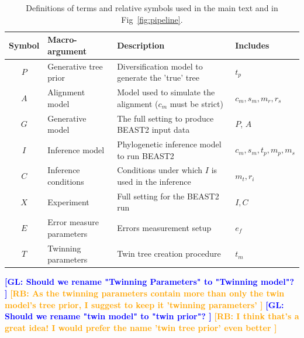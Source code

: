 \documentclass{article}
\newcommand{\giovanni}[1]{\textcolor{blue}{\textbf{[GL: #1]}}}
\newcommand{\richel}[1]{\textcolor{orange}{\textbf{[RB: #1]}}}
\begin{document}
\begin{table}
  \begin{tabular}{|@{}c|p{4cm}|p{9cm}|p{3cm}@{}|}
    \hline
    \centering
    \textbf{Symbol} & \textbf{Macro-argument} & \textbf{Description} 
      & \textbf{Includes} \\
    \hline
    $\mathit{P}$ & Generative tree prior & Diversification model to generate 
      the 'true' tree & $\mathit{t_{p}}$ \\
    $\mathit{A}$ & Alignment model & Model used to simulate the 
      alignment ($\mathit{c_{m}}$ must be strict) 
      & $\mathit{c_{m}}, \mathit{s_{m}}, \mathit{m_{r}}, \mathit{r_{s}}$ \\
    $\mathit{G}$ & Generative model & The full setting to produce BEAST2 input 
      data & $\mathit{P}$, $\mathit{A}$ \\
    $\mathit{I}$ & Inference model & Phylogenetic inference model to run BEAST2 
      & $\mathit{c_{m}}, \mathit{s_{m}}, \mathit{t_{p}}, 
      \mathit{m_{p}}, \mathit{m_{s}}$ \\
    $\mathit{C}$ & Inference conditions & Conditions under which $\mathit{I}$ 
      is used in the inference & $\mathit{m_{t}}, \mathit{r_{i}}$\\
    $\mathit{X}$ & Experiment & Full setting for the BEAST2 run & 
      $\mathit{I},\mathit{C}$ \\
    $\mathit{E}$ & Error measure parameters & Errors measurement setup & 
      $\mathit{e_{f}}$\\
    $\mathit{T}$ & Twinning parameters & Twin tree creation procedure & 
      $\mathit{t_{m}}$\\
    \hline 
  \end{tabular}
  \caption{
    Definitions of terms and relative symbols used in the main text and in 
    Fig~\ref{fig:pipeline}.
  }
  \label{tab:definitions}
  \giovanni{
    Should we rename "Twinning Parameters" to "Twinning model"?
  }
  \richel{
    As the twinning parameters contain more than only the twin model's tree 
    prior, I suggest to keep it 'twinning parameters'
  }
  \giovanni{
    Should we rename "twin model" to "twin prior"?
  }
  \richel{
    I think that's a great idea! I would prefer the name 'twin tree prior' even
    better
  }
\end{table}
\end{document}
